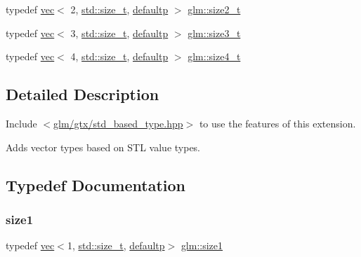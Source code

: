 \begin{DoxyCompactItemize}
\item 
typedef \mbox{\hyperlink{structglm_1_1vec}{vec}}$<$ 2, \mbox{\hyperlink{_s_d_l__config__winrt_8h_a7c94ea6f8948649f8d181ae55911eeaf}{std\+::size\+\_\+t}}, \mbox{\hyperlink{namespaceglm_a36ed105b07c7746804d7fdc7cc90ff25a9d21ccd8b5a009ec7eb7677befc3bf51}{defaultp}} $>$ \mbox{\hyperlink{group__gtx__std__based__type_ga701549a040be1f2f6f661ddecde337de}{glm\+::size2\+\_\+t}}
\item 
typedef \mbox{\hyperlink{structglm_1_1vec}{vec}}$<$ 3, \mbox{\hyperlink{_s_d_l__config__winrt_8h_a7c94ea6f8948649f8d181ae55911eeaf}{std\+::size\+\_\+t}}, \mbox{\hyperlink{namespaceglm_a36ed105b07c7746804d7fdc7cc90ff25a9d21ccd8b5a009ec7eb7677befc3bf51}{defaultp}} $>$ \mbox{\hyperlink{group__gtx__std__based__type_gaf0ec088c61853e4ed8155ef66b3760a2}{glm\+::size3\+\_\+t}}
\item 
typedef \mbox{\hyperlink{structglm_1_1vec}{vec}}$<$ 4, \mbox{\hyperlink{_s_d_l__config__winrt_8h_a7c94ea6f8948649f8d181ae55911eeaf}{std\+::size\+\_\+t}}, \mbox{\hyperlink{namespaceglm_a36ed105b07c7746804d7fdc7cc90ff25a9d21ccd8b5a009ec7eb7677befc3bf51}{defaultp}} $>$ \mbox{\hyperlink{group__gtx__std__based__type_ga2bb2915bb83bb9d7a2967fe20aa7d2a5}{glm\+::size4\+\_\+t}}
\end{DoxyCompactItemize}


\subsection{Detailed Description}
Include $<$\mbox{\hyperlink{std__based__type_8hpp}{glm/gtx/std\+\_\+based\+\_\+type.\+hpp}}$>$ to use the features of this extension.

Adds vector types based on S\+TL value types. 

\subsection{Typedef Documentation}
\mbox{\label{group__gtx__std__based__type_gaf471290b8165697d088a943263fc8af1}} 
\subsubsection{\texorpdfstring{size1}{size1}}
{\footnotesize\ttfamily typedef \mbox{\hyperlink{structglm_1_1vec}{vec}}$<$1, \mbox{\hyperlink{_s_d_l__config__winrt_8h_a7c94ea6f8948649f8d181ae55911eeaf}{std\+::size\+\_\+t}}, \mbox{\hyperlink{namespaceglm_a36ed105b07c7746804d7fdc7cc90ff25a9d21ccd8b5a009ec7eb7677befc3bf51}{defaultp}}$>$ \mbox{\hyperlink{group__gtx__std__based__type_gaf471290b8165697d088a943263fc8af1}{glm\+::size1}}}

